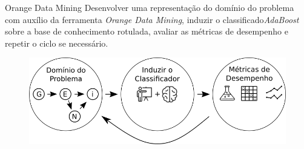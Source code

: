 \documentclass[10pt]{beamer}
\begin{document}
  \begin{frame}[fragile]{Orange Data Mining}
   Desenvolver uma representação do domínio do problema com auxílio da ferramenta \textit{Orange Data Mining}, induzir o classificado\textit{AdaBoost} sobre a base de conhecimento rotulada, avaliar as métricas de desempenho e repetir o ciclo se necessário.
  \begin{figure}[H]
  \begin{center}
      \includegraphics[scale=0.50]{images/methodology_2.png}
  \end{center}
  \end{figure}
  \end{frame}
\end{document}
